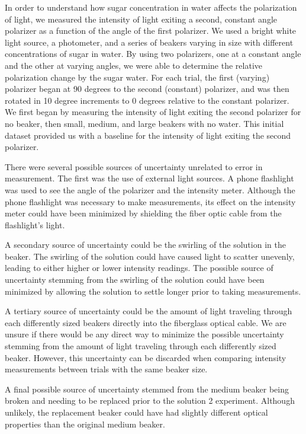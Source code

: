 

In order to understand how sugar concentration in water affects the polarization of light, we measured the intensity of light exiting a second, constant angle polarizer as a function of the angle of the first polarizer. We used a bright white light source, a photometer, and a series of beakers varying in size with different concentrations of sugar in water. By using two polarizers, one at a constant angle and the other at varying angles, we were able to determine the relative polarization change by the sugar water. For each trial, the first (varying) polarizer began at 90 degrees to the second (constant) polarizer, and was then rotated in 10 degree increments to 0 degrees relative to the constant polarizer. We first began by measuring the intensity of light exiting the second polarizer for no beaker, then small, medium, and large beakers with no water. This initial dataset provided us with a baseline for the intensity of light exiting the second polarizer.

There were several possible sources of uncertainty unrelated to error in measurement. The first was the use of external light sources. A phone flashlight was used to see the angle of the polarizer and the intensity meter. Although the phone flashlight was necessary to make measurements, its effect on the intensity meter could have been minimized by shielding the fiber optic cable from the flashlight's light.

A secondary source of uncertainty could be the swirling of the solution in the beaker. The swirling of the solution could have caused light to scatter unevenly, 
leading to either higher or lower intensity readings. The possible source of uncertainty stemming from the swirling of the solution could have been minimized 
by allowing the solution to settle longer prior to taking measurements.

A tertiary source of uncertainty could be the amount of light traveling through each differently sized beakers directly into the fiberglass optical cable. 
We are unsure if there would be any direct way to minimize the possible uncertainty stemming from the amount of light traveling through each differently sized beaker.
However, this uncertainty can be discarded when comparing intensity measurements between trials with the same beaker size.

A final possible source of uncertainty stemmed from the medium beaker being broken and needing to be replaced prior to the solution 2 experiment. Although unlikely,
the replacement beaker could have had slightly different optical properties than the original medium beaker. 